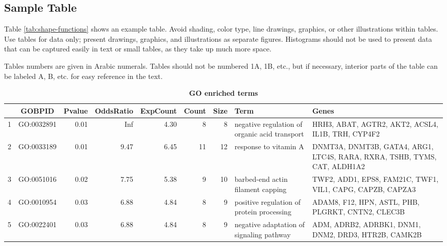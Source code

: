 \documentclass[9pt,twocolumn,twoside]{gsajnl}
\begin{document}
\subsection*{Sample Table}

Table \ref{tab:shape-functions} shows an example table. Avoid shading, color type, line drawings, graphics, or other illustrations within tables. Use tables for data only; present drawings, graphics, and illustrations as separate figures. Histograms should not be used to present data that can be captured easily in text or small tables, as they take up much more space.

Tables numbers are given in Arabic numerals. Tables should not be numbered 1A, 1B, etc., but if necessary, interior parts of the table can be labeled A, B, etc. for easy reference in the text.

\begin{table}[htbp]
\centering
\caption{\bf GO enriched terms}
\begin{tableminipage}{\textwidth}
 \begin{tabular}{|l|c|r|r|r|r|r|p{3cm}|p{3cm}|}
  \hline
 & GOBPID & Pvalue & OddsRatio & ExpCount & Count & Size & Term & Genes \\
  \hline
1 & GO:0032891 & 0.01 & Inf & 4.30 &   8 &   8 & negative regulation of organic acid transport & HRH3, ABAT, AGTR2, AKT2, ACSL4, IL1B, TRH, CYP4F2 \\
  2 & GO:0033189 & 0.01 & 9.47 & 6.45 &  11 &  12 & response to vitamin A & DNMT3A, DNMT3B, GATA4, ARG1, LTC4S, RARA, RXRA, TSHB, TYMS, CAT, ALDH1A2 \\
  3 & GO:0051016 & 0.02 & 7.75 & 5.38 &   9 &  10 & barbed-end actin filament capping & TWF2, ADD1, EPS8, FAM21C, TWF1, VIL1, CAPG, CAPZB, CAPZA3 \\
  4 & GO:0010954 & 0.03 & 6.88 & 4.84 &   8 &   9 & positive regulation of protein processing & ADAM8, F12, HPN, ASTL, PHB, PLGRKT, CNTN2, CLEC3B \\
  5 & GO:0022401 & 0.03 & 6.88 & 4.84 &   8 &   9 & negative adaptation of signaling pathway & ADM, ADRB2, ADRBK1, DNM1, DNM2, DRD3, HTR2B, CAMK2B \\
   \hline
 \end{tabular}
 \label{tab:GOenrichment}
\end{tableminipage}
\end{table}


\end{document}
